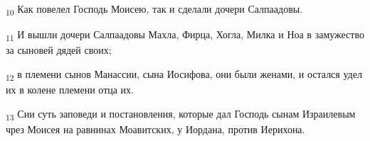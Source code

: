 \begin{tcolorbox}
\textsubscript{10} Как повелел Господь Моисею, так и сделали дочери Салпаадовы.
\end{tcolorbox}
\begin{tcolorbox}
\textsubscript{11} И вышли дочери Салпаадовы Махла, Фирца, Хогла, Милка и Ноа в замужество за сыновей дядей своих;
\end{tcolorbox}
\begin{tcolorbox}
\textsubscript{12} в племени сынов Манассии, сына Иосифова, они были женами, и остался удел их в колене племени отца их.
\end{tcolorbox}
\begin{tcolorbox}
\textsubscript{13} Сии суть заповеди и постановления, которые дал Господь сынам Израилевым чрез Моисея на равнинах Моавитских, у Иордана, против Иерихона.
\end{tcolorbox}
